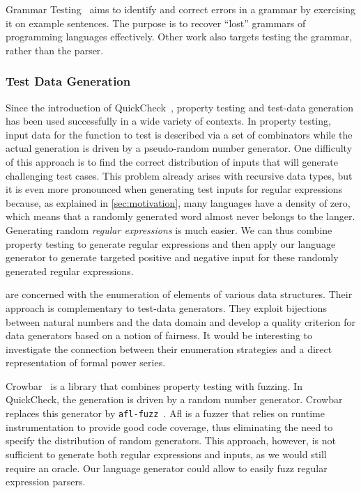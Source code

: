 Grammar Testing~\cite{DBLP:conf/fase/Lammel01} aims to
identify and correct errors in a grammar by exercising it on example
sentences. The purpose is to recover ``lost'' grammars of programming
languages effectively.
Other work \cite{DBLP:conf/compsac/LiJLG04} also targets
testing the grammar, rather than the parser.

\subsubsection*{Test Data Generation}

Since the introduction of
QuickCheck~\cite{DBLP:conf/icfp/ClaessenH00}, property testing and
test-data generation has been used successfully in a wide variety of
contexts.  In property testing, input data for the function to test is
described via a set of combinators while the actual generation is
driven by a pseudo-random number generator. One difficulty of this
approach is to find the correct distribution of inputs that will
generate challenging test cases. This problem already arises with
recursive data types, but it is even more pronounced when generating
test inputs for regular expressions because, as explained in
\cref{sec:motivation}, many languages have a density of zero, which
means that a randomly generated word almost never belongs to the
langer.  Generating random \emph{regular expressions} is much
easier. We can thus combine property testing to generate regular
expressions and then apply our language generator to generate targeted
positive and negative input for these randomly generated regular
expressions.

\citet{DBLP:journals/jfp/NewFFM17} are concerned with the enumeration
of elements of various data structures. Their approach is
complementary to test-data generators. They exploit bijections between
natural numbers and the data domain and develop a quality criterion
for data generators based on a notion of fairness. It would be
interesting to investigate the connection between their enumeration
strategies and a direct representation of formal power series.

Crowbar~\cite{crowbar} is a library that combines property testing
with fuzzing.  In QuickCheck, the generation is driven by a random
number generator. Crowbar replaces this generator by
\texttt{afl-fuzz}~\cite{afl}. Afl is a fuzzer that relies on runtime
instrumentation to provide good code coverage, thus eliminating the
need to specify the distribution of random generators.  This approach,
however, is not sufficient to generate both regular expressions and
inputs, as we would still require an oracle. Our language generator
could allow to easily fuzz regular expression parsers.



